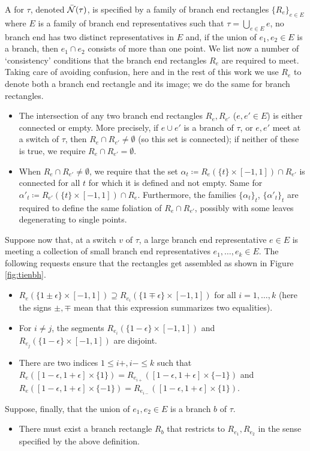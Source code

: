 \begin{defin}
A  for $\tau$, denoted $\bar{{\mathcal N}}(\tau)$, is specified by a family of branch end rectangles $\{R_e\}_{e\in E}$ where $E$ is a family of branch end representatives such that $\tau=\bigcup_{e\in E} e$, no branch end has two distinct representatives in $E$ and, if the union of $e_1,e_2\in E$ is a branch, then $e_1\cap e_2$ consists of more than one point. We list now a number of `consistency' conditions that the branch end rectangles $R_e$ are required to meet. Taking care of avoiding confusion, here and in the rest of this work we use $R_e$ to denote both a branch end rectangle and its image; we do the same for branch rectangles.

\begin{itemize}
\item The intersection of any two branch end rectangles $R_e, R_{e'}$ ($e,e'\in E$) is either connected or empty. More precisely, if $e\cup e'$ is a branch of $\tau$, or $e,e'$ meet at a switch of $\tau$, then $R_e\cap R_{e'}\not=\emptyset$ (so this set is connected); if neither of these is true, we require $R_e\cap R_{e'}=\emptyset$.
\item When $R_e\cap R_{e'}\not=\emptyset$, we require that the set $\alpha_t\coloneqq R_e(\{t\}\times [-1,1])\cap R_{e'}$ is connected for all $t$ for which it is defined and not empty. Same for $\alpha'_t\coloneqq R_{e'}(\{t\}\times [-1,1])\cap R_{e}$. Furthermore, the families $\{\alpha_t\}_t$, $\{\alpha'_t\}_t$ are required to define the same foliation of $R_e\cap R_{e'}$, possibly with some leaves degenerating to single points.
\end{itemize}
Suppose now that, at a switch $v$ of $\tau$, a large branch end representative $e\in E$ is meeting a collection of small branch end representatives $e_1,\ldots,	e_k\in E$. The following requests ensure that the rectangles get assembled as shown in Figure \ref{fig:tienbh}.
\begin{itemize}
\item $R_e(\{1\pm\epsilon\}\times[-1,1])\supseteq R_{e_i}(\{1\mp\epsilon\}\times[-1,1])$ for all $i=1,\ldots, k$ (here the signs $\pm,\mp$ mean that this expression summarizes two equalities).
\item For $i\not=j$, the segments $R_{e_i}(\{1-\epsilon\}\times[-1,1])$ and $R_{e_j}(\{1-\epsilon\}\times[-1,1])$ are disjoint.
\item There are two indices $1\leq i+,i-\leq k$ such that $R_e([1-\epsilon,1+\epsilon]\times \{1\})=R_{e_{i+}}([1-\epsilon,1+\epsilon]\times \{-1\})$ and $R_e([1-\epsilon,1+\epsilon]\times \{-1\})=R_{e_{i-}}([1-\epsilon,1+\epsilon]\times \{1\})$.
\end{itemize}
Suppose, finally, that the union of $e_1,e_2\in E$ is a branch $b$ of $\tau$.
\begin{itemize}
\item There must exist a branch rectangle $R_b$ that restricts to $R_{e_1},R_{e_2}$ in the sense specified by the above definition.
\end{itemize}


\end{defin}
